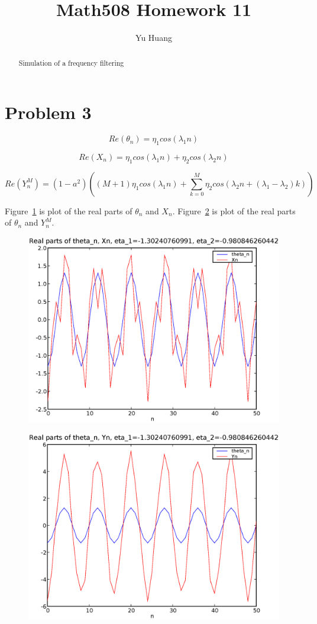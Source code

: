 \documentclass[a4paper,10pt]{article}
\title{Math508 Homework 11}
\author{Yu Huang}
\begin{document}
\maketitle

\begin{abstract}
Simulation of a frequency filtering
\end{abstract}

\section{Problem 3}
\begin{equation}
Re(\theta_n) = \eta_1 cos(\lambda_1 n)
\end{equation}

\begin{equation}
Re(X_n) = \eta_1 cos(\lambda_1 n) + \eta_2 cos(\lambda_2 n)
\end{equation}

\begin{equation}
Re(Y_n^M) = (1-a^2)((M+1)\eta_1 cos(\lambda_1 n) + \sum_{k=0}^M \eta_2 cos(\lambda_2 n + (\lambda_1-\lambda_2) k))
\end{equation}

Figure~\ref{f1} is plot of the real parts of $\theta_n$ and $X_n$. Figure~\ref{f2} is plot of the real parts of $\theta_n$ and $Y_n^M$.

\begin{figure}
\includegraphics[width=1\textwidth]{hw11_3_theta_n_Xn.eps}
\caption{}\label{f1}
\end{figure}

\begin{figure}
\includegraphics[width=1\textwidth]{hw11_3_theta_n_Yn.eps}
\caption{}\label{f2}
\end{figure}
\end{document}
